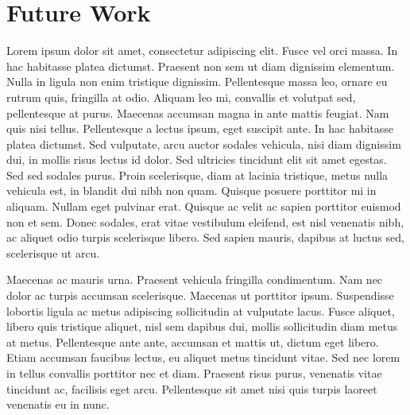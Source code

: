 \documentclass[botnum,fleqn,final]{unmeethesis}
\begin{document}
\chapter{\label{chapter:fw}Future Work}

Lorem ipsum dolor sit amet, consectetur adipiscing elit. Fusce vel orci massa.
In hac habitasse platea dictumst. Praesent non sem ut diam dignissim elementum.
Nulla in ligula non enim tristique dignissim. Pellentesque massa leo, ornare eu
rutrum quis, fringilla at odio. Aliquam leo mi, convallis et volutpat sed,
pellentesque at purus. Maecenas accumsan magna in ante mattis feugiat. Nam quis
nisi tellus. Pellentesque a lectus ipsum, eget suscipit ante. In hac habitasse
platea dictumst. Sed vulputate, arcu auctor sodales vehicula, nisi diam
dignissim dui, in mollis risus lectus id dolor. Sed ultricies tincidunt elit
sit amet egestas. Sed sed sodales purus. Proin scelerisque, diam at lacinia
tristique, metus nulla vehicula est, in blandit dui nibh non quam. Quisque
posuere porttitor mi in aliquam. Nullam eget pulvinar erat. Quisque ac velit ac
sapien porttitor euismod non et sem. Donec sodales, erat vitae vestibulum
eleifend, est nisl venenatis nibh, ac aliquet odio turpis scelerisque libero.
Sed sapien mauris, dapibus at luctus sed, scelerisque ut arcu.

Maecenas ac mauris urna. Praesent vehicula fringilla condimentum. Nam nec dolor
ac turpis accumsan scelerisque. Maecenas ut porttitor ipsum. Suspendisse
lobortis ligula ac metus adipiscing sollicitudin at vulputate lacus. Fusce
aliquet, libero quis tristique aliquet, nisl sem dapibus dui, mollis
sollicitudin diam metus at metus. Pellentesque ante ante, accumsan et mattis
ut, dictum eget libero. Etiam accumsan faucibus lectus, eu aliquet metus
tincidunt vitae. Sed nec lorem in tellus convallis porttitor nec et diam.
Praesent risus purus, venenatis vitae tincidunt ac, facilisis eget arcu.
Pellentesque sit amet nisi quis turpis laoreet venenatis eu in nunc.
\end{document}
